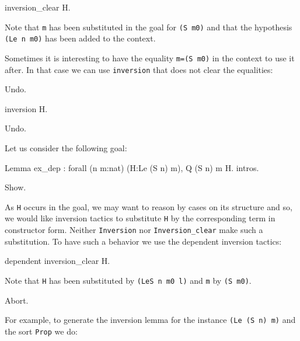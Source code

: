 \begin{coq_example*}
\begin{coq_example}
inversion_clear H.
\end{coq_example}

Note that \texttt{m} has been substituted in the goal for \texttt{(S m0)}
and that the hypothesis \texttt{(Le n m0)} has been added to the
context.

Sometimes it is
interesting to have the equality \texttt{m=(S m0)} in the
context to use it after. In that case we can use \texttt{inversion} that
does not clear the equalities:

\begin{coq_example*}
Undo.
\end{coq_example*}

\begin{coq_example}
inversion H.
\end{coq_example}

\begin{coq_eval}
Undo.
\end{coq_eval}


Let us consider the following goal:

\begin{coq_eval}
Lemma ex_dep : forall (n m:nat) (H:Le (S n) m), Q (S n) m H.
intros.
\end{coq_eval}

\begin{coq_example}
Show.
\end{coq_example}

As \texttt{H} occurs in the goal, we may want to reason by cases on its
structure and so, we would like  inversion tactics to
substitute \texttt{H} by the corresponding term in constructor form. 
Neither \texttt{Inversion} nor  {\tt Inversion\_clear} make such a
substitution. 
To have such a behavior we use the dependent inversion tactics:

\begin{coq_example}
dependent inversion_clear H.
\end{coq_example}

Note that \texttt{H} has been substituted by \texttt{(LeS n m0 l)} and
\texttt{m} by \texttt{(S m0)}.


\begin{coq_eval}
Abort.
\end{coq_eval}

For example, to generate the inversion lemma for the instance
\texttt{(Le (S n) m)} and the sort \texttt{Prop} we do:


\end{coq_example*}
